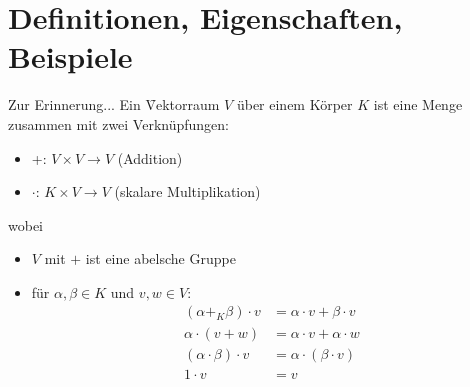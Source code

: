 \section{Definitionen, Eigenschaften, Beispiele}
Zur Erinnerung... Ein \f{Vektorraum} $V$ über einem Körper $K$ ist eine Menge zusammen mit zwei Verknüpfungen:
\begin{itemize}
 \item +: $V \times V \rightarrow V$ (Addition)
 \item $\cdot$: $K \times V \rightarrow V$ (skalare Multiplikation)
\end{itemize}
wobei
\begin{itemize}
 \item $V$ mit $+$ ist eine abelsche Gruppe
 \item für $\alpha, \beta \in K$ und $v, w \in V$:
\begin{align}
(\alpha +_K \beta)\cdot v &= \alpha\cdot v  + \beta\cdot v \\
\alpha\cdot (v + w) &= \alpha\cdot v + \alpha\cdot w \\
(\alpha\cdot\beta) \cdot v &= \alpha\cdot(\beta\cdot v) \\
1 \cdot v &= v
\end{align}
\end{itemize}

